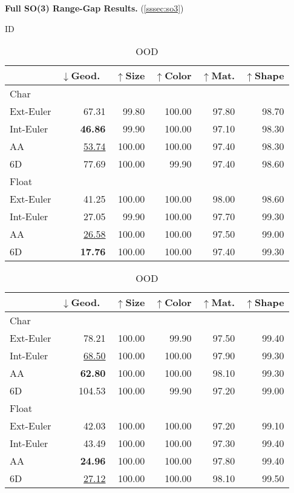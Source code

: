 \begin{table}
\centering
\caption{\textbf{Full SO(3) Range-Gap Results.} (\cref{sssec:so3})}
\begin{subtable}[h]{0.495\linewidth}
\centering
\caption{ID}
{
\setlength{\tabcolsep}{2pt}
\begin{tabular}{lrrrrr}
\toprule
& $\downarrow$Geod.\ & $\uparrow$Size & $\uparrow$Color & $\uparrow$Mat. & $\uparrow$Shape \\
\midrule
Char \\
\cline{1-1}
Ext-Euler & 67.31 & 99.80 & 100.00 & 97.80 & 98.70 \\
Int-Euler & \textbf{46.86} & 99.90 & 100.00 & 97.10 & 98.30 \\
AA & \underline{53.74} & 100.00 & 100.00 & 97.40 & 98.30 \\
6D & 77.69 & 100.00 & 99.90 & 97.40 & 98.60 \\
\hline
Float \\
\cline{1-1}
Ext-Euler & 41.25 & 100.00 & 100.00 & 98.00 & 98.60 \\
Int-Euler & 27.05 & 99.90 & 100.00 & 97.70 & 99.30 \\
AA & \underline{26.58} & 100.00 & 100.00 & 97.50 & 99.00 \\
6D & \textbf{17.76} & 100.00 & 100.00 & 97.40 & 99.30 \\
\bottomrule
\end{tabular}
}
\label{table:so3_id}
\end{subtable}
\hfill
\begin{subtable}[h]{0.495\linewidth}
\centering
\caption{OOD}
{
\setlength{\tabcolsep}{2pt}
\setlength{\tabcolsep}{2pt}
\begin{tabular}{lrrrrr}
\toprule
& $\downarrow$Geod.\ & $\uparrow$Size & $\uparrow$Color & $\uparrow$Mat. & $\uparrow$Shape \\
\midrule
Char \\
\cline{1-1}
Ext-Euler & 78.21 & 100.00 & 99.90 & 97.50 & 99.40 \\
Int-Euler & \underline{68.50} & 100.00 & 100.00 & 97.90 & 99.30 \\
AA & \textbf{62.80} & 100.00 & 100.00 & 98.10 & 99.30 \\
6D & 104.53 & 100.00 & 99.90 & 97.20 & 99.00 \\
\hline
Float \\
\cline{1-1}
Ext-Euler & 42.03 & 100.00 & 100.00 & 97.20 & 99.10 \\
Int-Euler & 43.49 & 100.00 & 100.00 & 97.30 & 99.40 \\
AA & \textbf{24.96} & 100.00 & 100.00 & 97.80 & 99.40 \\
6D & \underline{27.12} & 100.00 & 100.00 & 98.10 & 99.50 \\
\bottomrule
\end{tabular}
}
\label{table:so3_ood}
\end{subtable}
\label{table:so3}
\end{table}

